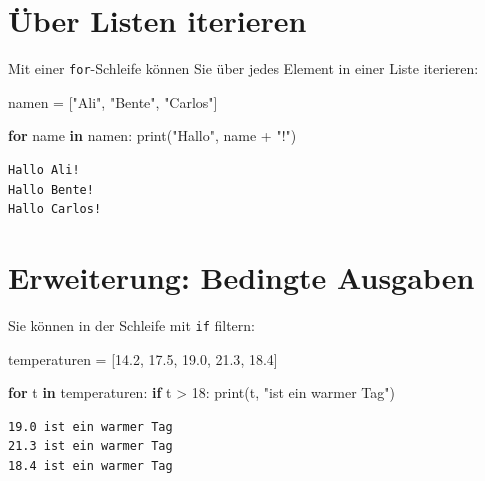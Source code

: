 \documentclass[
  letterpaper,
  DIV=11,
  numbers=noendperiod]{scrreprt}
\newenvironment{Shaded}{\begin{snugshade}}{\end{snugshade}}
\newcommand{\BuiltInTok}[1]{\textcolor[rgb]{0.00,0.23,0.31}{#1}}
\newcommand{\ControlFlowTok}[1]{\textcolor[rgb]{0.00,0.23,0.31}{\textbf{#1}}}
\newcommand{\DecValTok}[1]{\textcolor[rgb]{0.68,0.00,0.00}{#1}}
\newcommand{\FloatTok}[1]{\textcolor[rgb]{0.68,0.00,0.00}{#1}}
\newcommand{\KeywordTok}[1]{\textcolor[rgb]{0.00,0.23,0.31}{\textbf{#1}}}
\newcommand{\NormalTok}[1]{\textcolor[rgb]{0.00,0.23,0.31}{#1}}
\newcommand{\OperatorTok}[1]{\textcolor[rgb]{0.37,0.37,0.37}{#1}}
\newcommand{\StringTok}[1]{\textcolor[rgb]{0.13,0.47,0.30}{#1}}
\begin{document}
\section{Über Listen iterieren}\label{uxfcber-listen-iterieren}

Mit einer \texttt{for}-Schleife können Sie über jedes Element in einer
Liste iterieren:

\begin{Shaded}
\begin{Highlighting}[]
\NormalTok{namen }\OperatorTok{=}\NormalTok{ [}\StringTok{"Ali"}\NormalTok{, }\StringTok{"Bente"}\NormalTok{, }\StringTok{"Carlos"}\NormalTok{]}

\ControlFlowTok{for}\NormalTok{ name }\KeywordTok{in}\NormalTok{ namen:}
    \BuiltInTok{print}\NormalTok{(}\StringTok{"Hallo"}\NormalTok{, name }\OperatorTok{+} \StringTok{"!"}\NormalTok{)}
\end{Highlighting}
\end{Shaded}

\begin{verbatim}
Hallo Ali!
Hallo Bente!
Hallo Carlos!
\end{verbatim}

\section{Erweiterung: Bedingte
Ausgaben}\label{erweiterung-bedingte-ausgaben}

Sie können in der Schleife mit \texttt{if} filtern:

\begin{Shaded}
\begin{Highlighting}[]
\NormalTok{temperaturen }\OperatorTok{=}\NormalTok{ [}\FloatTok{14.2}\NormalTok{, }\FloatTok{17.5}\NormalTok{, }\FloatTok{19.0}\NormalTok{, }\FloatTok{21.3}\NormalTok{, }\FloatTok{18.4}\NormalTok{]}

\ControlFlowTok{for}\NormalTok{ t }\KeywordTok{in}\NormalTok{ temperaturen:}
    \ControlFlowTok{if}\NormalTok{ t }\OperatorTok{\textgreater{}} \DecValTok{18}\NormalTok{:}
        \BuiltInTok{print}\NormalTok{(t, }\StringTok{"ist ein warmer Tag"}\NormalTok{)}
\end{Highlighting}
\end{Shaded}

\begin{verbatim}
19.0 ist ein warmer Tag
21.3 ist ein warmer Tag
18.4 ist ein warmer Tag
\end{verbatim}
\end{document}
